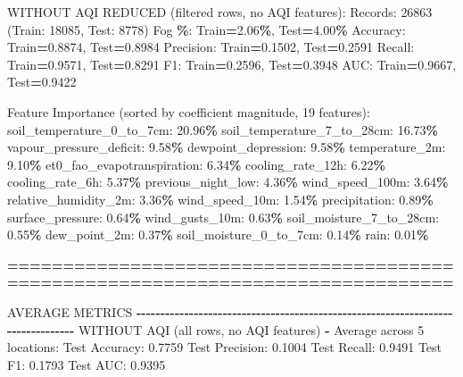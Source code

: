\documentclass[
  letterpaper,
  DIV=11,
  numbers=noendperiod]{scrartcl}
\newenvironment{Shaded}{\begin{snugshade}}{\end{snugshade}}
\newcommand{\BuiltInTok}[1]{#1}
\newcommand{\DecValTok}[1]{\textcolor[rgb]{0.00,0.00,0.81}{#1}}
\newcommand{\FloatTok}[1]{\textcolor[rgb]{0.00,0.00,0.81}{#1}}
\newcommand{\NormalTok}[1]{#1}
\newcommand{\OperatorTok}[1]{\textcolor[rgb]{0.81,0.36,0.00}{\textbf{#1}}}
\begin{document}
\begin{Shaded}
\begin{Highlighting}[]
\NormalTok{WITHOUT AQI REDUCED (filtered rows, no AQI features):}
\NormalTok{  Records: }\DecValTok{26863}\NormalTok{ (Train: }\DecValTok{18085}\NormalTok{, Test: }\DecValTok{8778}\NormalTok{)}
\NormalTok{  Fog }\OperatorTok{\%}\NormalTok{: Train}\OperatorTok{=}\FloatTok{2.06}\OperatorTok{\%}\NormalTok{, Test}\OperatorTok{=}\FloatTok{4.00}\OperatorTok{\%}
\NormalTok{  Accuracy: Train}\OperatorTok{=}\FloatTok{0.8874}\NormalTok{, Test}\OperatorTok{=}\FloatTok{0.8984}
\NormalTok{  Precision: Train}\OperatorTok{=}\FloatTok{0.1502}\NormalTok{, Test}\OperatorTok{=}\FloatTok{0.2591}
\NormalTok{  Recall: Train}\OperatorTok{=}\FloatTok{0.9571}\NormalTok{, Test}\OperatorTok{=}\FloatTok{0.8291}
\NormalTok{  F1: Train}\OperatorTok{=}\FloatTok{0.2596}\NormalTok{, Test}\OperatorTok{=}\FloatTok{0.3948}
\NormalTok{  AUC: Train}\OperatorTok{=}\FloatTok{0.9667}\NormalTok{, Test}\OperatorTok{=}\FloatTok{0.9422}

\NormalTok{  Feature Importance (}\BuiltInTok{sorted}\NormalTok{ by coefficient magnitude, }\DecValTok{19}\NormalTok{ features):}
\NormalTok{    soil\_temperature\_0\_to\_7cm: }\FloatTok{20.96}\OperatorTok{\%}
\NormalTok{    soil\_temperature\_7\_to\_28cm: }\FloatTok{16.73}\OperatorTok{\%}
\NormalTok{    vapour\_pressure\_deficit: }\FloatTok{9.58}\OperatorTok{\%}
\NormalTok{    dewpoint\_depression: }\FloatTok{9.58}\OperatorTok{\%}
\NormalTok{    temperature\_2m: }\FloatTok{9.10}\OperatorTok{\%}
\NormalTok{    et0\_fao\_evapotranspiration: }\FloatTok{6.34}\OperatorTok{\%}
\NormalTok{    cooling\_rate\_12h: }\FloatTok{6.22}\OperatorTok{\%}
\NormalTok{    cooling\_rate\_6h: }\FloatTok{5.37}\OperatorTok{\%}
\NormalTok{    previous\_night\_low: }\FloatTok{4.36}\OperatorTok{\%}
\NormalTok{    wind\_speed\_100m: }\FloatTok{3.64}\OperatorTok{\%}
\NormalTok{    relative\_humidity\_2m: }\FloatTok{3.36}\OperatorTok{\%}
\NormalTok{    wind\_speed\_10m: }\FloatTok{1.54}\OperatorTok{\%}
\NormalTok{    precipitation: }\FloatTok{0.89}\OperatorTok{\%}
\NormalTok{    surface\_pressure: }\FloatTok{0.64}\OperatorTok{\%}
\NormalTok{    wind\_gusts\_10m: }\FloatTok{0.63}\OperatorTok{\%}
\NormalTok{    soil\_moisture\_7\_to\_28cm: }\FloatTok{0.55}\OperatorTok{\%}
\NormalTok{    dew\_point\_2m: }\FloatTok{0.37}\OperatorTok{\%}
\NormalTok{    soil\_moisture\_0\_to\_7cm: }\FloatTok{0.14}\OperatorTok{\%}
\NormalTok{    rain: }\FloatTok{0.01}\OperatorTok{\%}

\OperatorTok{================================================================================}

\NormalTok{AVERAGE METRICS}
\OperatorTok{{-}{-}{-}{-}{-}{-}{-}{-}{-}{-}{-}{-}{-}{-}{-}{-}{-}{-}{-}{-}{-}{-}{-}{-}{-}{-}{-}{-}{-}{-}{-}{-}{-}{-}{-}{-}{-}{-}{-}{-}{-}{-}{-}{-}{-}{-}{-}{-}{-}{-}{-}{-}{-}{-}{-}{-}{-}{-}{-}{-}{-}{-}{-}{-}{-}{-}{-}{-}{-}{-}{-}{-}{-}{-}{-}{-}{-}{-}{-}{-}}
\NormalTok{WITHOUT AQI (}\BuiltInTok{all}\NormalTok{ rows, no AQI features) }\OperatorTok{{-}}\NormalTok{ Average across }\DecValTok{5}\NormalTok{ locations:}
\NormalTok{  Test Accuracy: }\FloatTok{0.7759}
\NormalTok{  Test Precision: }\FloatTok{0.1004}
\NormalTok{  Test Recall: }\FloatTok{0.9491}
\NormalTok{  Test F1: }\FloatTok{0.1793}
\NormalTok{  Test AUC: }\FloatTok{0.9395}


\end{Highlighting}
\end{Shaded}
\end{document}

